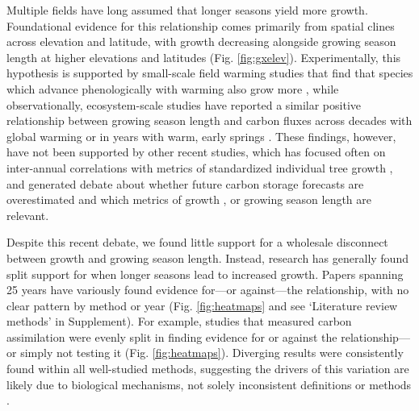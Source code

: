 \documentclass[11pt]{article}
\begin{document}
Multiple fields have long assumed that longer seasons yield more growth. Foundational evidence for this relationship comes primarily from spatial clines across elevation and latitude, with growth decreasing alongside growing season length at higher elevations and latitudes (Fig. \ref{fig:gxelev}). Experimentally, this hypothesis is supported by small-scale field warming studies that find that species which advance phenologically with warming also grow more \citep[][]{Cleland:2012}, while observationally, ecosystem-scale studies have reported a similar positive relationship between growing season length and carbon fluxes across decades with global warming \citep{keenan2014net} or in years with warm, early springs \citep{chen1999effects}. These findings, however, have not been supported by other recent studies, which has focused often on inter-annual correlations with metrics of standardized individual tree growth \citep{dow2022warm,silvestro2023longer}, and generated debate about whether future carbon storage forecasts are overestimated and which metrics of growth \citep{green2022limits}, or growing season length \citep{korner2023four} are relevant.

Despite this recent debate, we found little support for a wholesale disconnect between growth and growing season length. Instead, research has generally found split support for when longer seasons lead to increased growth. Papers spanning 25 years have variously found evidence for---or against---the relationship, with no clear pattern by method or year (Fig. \ref{fig:heatmaps} and see `Literature review methods' in Supplement). For example, studies that measured carbon assimilation were evenly split in finding evidence for or against the relationship---or simply not testing it (Fig. \ref{fig:heatmaps}). Diverging results were consistently found within all well-studied methods, suggesting the drivers of this variation are likely due to biological mechanisms, not solely inconsistent definitions or methods \citep[as some, e.g. ][have recently suggested]{green2022limits,korner2023four}. 
\end{document}
